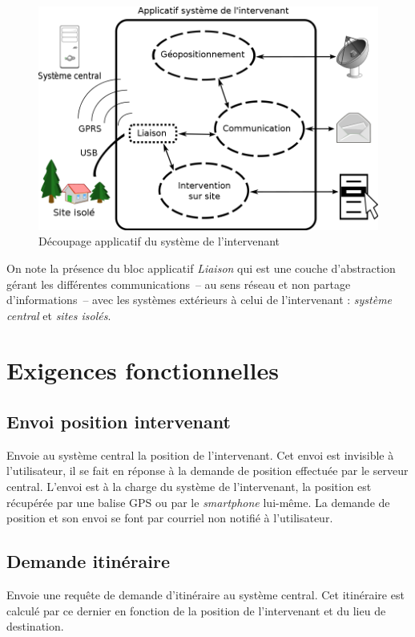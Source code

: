 \documentclass[a4paper, 11pt, final]{article}
\begin{document}
\begin{figure}[!h]
\begin{center}
\includegraphics[width=\textwidth]{schema_modules_pda.png}
\caption{Découpage applicatif du système de l'intervenant}
\end{center}
\end{figure}

On note la présence du bloc applicatif \emph{Liaison} qui est une couche d'abstraction gérant les différentes communications~-- au sens réseau et non partage d'informations~-- avec les systèmes extérieurs à celui de l'intervenant : \emph{système central} et \emph{sites isolés}.

\section{Exigences fonctionnelles}

\subsection{Envoi position intervenant}
Envoie au système central la position de l'intervenant. Cet envoi est invisible à l'utilisateur, il se fait en réponse à la demande de position effectuée par le serveur central. L'envoi est à la charge du système de l'intervenant, la position est récupérée par une balise GPS ou par le \emph{smartphone} lui-même. La demande de position et son envoi se font par courriel non notifié à l'utilisateur.

\subsection{Demande itinéraire}
Envoie une requête de demande d'itinéraire au système central. Cet itinéraire est calculé par ce dernier en fonction de la position de l'intervenant et du lieu de destination.
\end{document}

